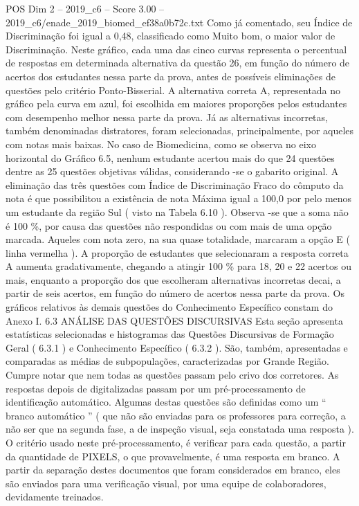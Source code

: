 \begin{textsample}{POS Dim 2 – 2019\_c6 – Score 3.00 – 2019\_c6/enade\_2019\_biomed\_ef38a0b72c.txt}
Como já comentado, seu Índice de Discriminação foi igual a 0,48, classificado como Muito bom, o maior valor de Discriminação.
Neste gráfico, cada uma das cinco curvas representa o percentual de respostas em determinada alternativa da questão 26, em função do número de acertos dos estudantes nessa parte da prova, antes de possíveis eliminações de questões pelo critério Ponto-Bisserial.
A alternativa correta A, representada no gráfico pela curva em azul, foi escolhida em maiores proporções pelos estudantes com desempenho melhor nessa parte da prova.
Já as alternativas incorretas, também denominadas distratores, foram selecionadas, principalmente, por aqueles com notas mais baixas.
No caso de Biomedicina, como se observa no eixo horizontal do Gráfico 6.5, nenhum estudante acertou mais do que 24 questões dentre as 25 questões objetivas válidas, considerando -se o gabarito original.
A eliminação das três questões com Índice de Discriminação Fraco do cômputo da nota é que possibilitou a existência de nota Máxima igual a 100,0 por pelo menos um estudante da região Sul ( visto na Tabela 6.10 ).
Observa -se que a soma não é 100 \%, por causa das questões não respondidas ou com mais de uma opção marcada.
Aqueles com nota zero, na sua quase totalidade, marcaram a opção E ( linha vermelha ).
A proporção de estudantes que selecionaram a resposta correta A aumenta gradativamente, chegando a atingir 100 \% para 18, 20 e 22 acertos ou mais, enquanto a proporção dos que escolheram alternativas incorretas decai, a partir de seis acertos, em função do número de acertos nessa parte da prova.
Os gráficos relativos às demais questões do Conhecimento Específico constam do Anexo I. 6.3 ANÁLISE DAS QUESTÕES DISCURSIVAS Esta seção apresenta estatísticas selecionadas e histogramas das Questões Discursivas de Formação Geral ( 6.3.1 ) e Conhecimento Específico ( 6.3.2 ).
São, também, apresentadas e comparadas as médias de subpopulações, caracterizadas por Grande Região.
Cumpre notar que nem todas as questões passam pelo crivo dos corretores.
As respostas depois de digitalizadas passam por um pré-processamento de identificação automático.
Algumas destas questões são definidas como um “ branco automático ” ( que não são enviadas para os professores para correção, a não ser que na segunda fase, a de inspeção visual, seja constatada uma resposta ).
O critério usado neste pré-processamento, é verificar para cada questão, a partir da quantidade de PIXELS, o que provavelmente, é uma resposta em branco.
A partir da separação destes documentos que foram considerados em branco, eles são enviados para uma verificação visual, por uma equipe de colaboradores, devidamente treinados.

\end{textsample}
